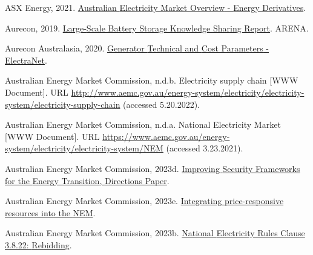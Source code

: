 \documentclass[12pt,a4paper,]{report}
\newlength{\cslhangindent}
\newenvironment{CSLReferences}[2] %
 {%
  \setlength{\parindent}{0pt}
  \ifodd #1 \everypar{\setlength{\hangindent}{\cslhangindent}}\ignorespaces\fi
  \ifnum #2 > 0
  \setlength{\parskip}{#2\baselineskip}
  \fi
 }%
 {}
\begin{document}
\begin{CSLReferences}{1}{0}
\leavevmode{}%
ASX Energy, 2021.
\href{https://www.asxenergy.com.au/products/electricity_futures}{Australian
{Electricity Market Overview} - {Energy Derivatives}}.

\leavevmode{}%
Aurecon, 2019.
\href{https://arena.gov.au/knowledge-bank/large-scale-battery-storage-knowledge-sharing-report/}{Large-{Scale
Battery Storage Knowledge Sharing Report}}. {ARENA}.

\leavevmode{}%
Aurecon Australasia, 2020.
\href{https://www.electranet.com.au/wp-content/uploads/projects/2016/11/508986-REP-ElectraNet-Generator-Technical-And-Cost-Parameters-23July2020.pdf}{Generator
{Technical} and {Cost Parameters} - {ElectraNet}}.

\leavevmode{}%
Australian Energy Market Commission, n.d.b. Electricity supply chain
{[}WWW Document{]}. URL
\url{http://www.aemc.gov.au/energy-system/electricity/electricity-system/electricity-supply-chain}
(accessed 5.20.2022).

\leavevmode{}%
Australian Energy Market Commission, n.d.a. National {Electricity
Market} {[}WWW Document{]}. URL
\url{https://www.aemc.gov.au/energy-system/electricity/electricity-system/NEM}
(accessed 3.23.2021).

\leavevmode{}%
Australian Energy Market Commission, 2023d.
\href{https://www.aemc.gov.au/sites/default/files/2023-08/ERC0290\%20\%E2\%80\%93\%20Improving\%20security\%20frameworks\%20for\%20the\%20energy\%20transition.pdf}{Improving
{Security Frameworks} for the {Energy Transition}, {Directions Paper}}.

\leavevmode{}%
Australian Energy Market Commission, 2023e.
\href{https://www.aemc.gov.au/sites/default/files/2023-08/ERC0352\%20-\%20Integrating\%20price-responsive\%20resources\%20into\%20the\%20NEM\%20-\%20Consultation\%20paper.pdf}{Integrating
price-responsive resources into the {NEM}}.

\leavevmode{}%
Australian Energy Market Commission, 2023b.
\href{https://energy-rules.aemc.gov.au/ner/477/272296\#3.8.22}{National
{Electricity Rules Clause} 3.8.22: {Rebidding}}.


\end{CSLReferences}
\end{document}
